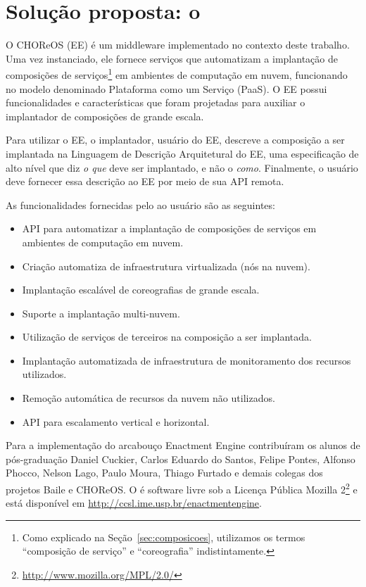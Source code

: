 \chapter{Solução proposta: o \ee}
\label{cap:solucao}

O CHOReOS \ee (EE) é um middleware implementado no contexto deste trabalho.
Uma vez instanciado, ele fornece serviços que automatizam
a implantação de composições de serviços\footnote{Como explicado na Seção~\ref{sec:composicoes}, utilizamos os termos 
``composição de serviço'' e ``coreografia'' indistintamente.} 
em ambientes de computação em nuvem,
funcionando no modelo denominado Plataforma como um Serviço (PaaS).
O EE possui funcionalidades e características que foram projetadas para auxiliar o
implantador de composições de grande escala.

Para utilizar o EE, o implantador, usuário do EE, descreve a composição a ser implantada
na Linguagem de Descrição Arquitetural do EE, uma especificação de alto nível que
diz \emph{o que} deve ser implantado, e não o \emph{como}. 
Finalmente, o usuário deve fornecer essa descrição ao EE por meio de sua API remota.

As funcionalidades fornecidas pelo \ee ao usuário são as seguintes:

\begin{itemize}
\item API para automatizar a implantação de composições de serviços em ambientes de computação em nuvem.
\item Criação automatiza de infraestrutura virtualizada (nós na nuvem).
\item Implantação escalável de coreografias de grande escala.
\item Suporte a implantação multi-nuvem.
\item Utilização de serviços de terceiros na composição a ser implantada.
\item Implantação automatizada de infraestrutura de monitoramento dos recursos utilizados.
\item Remoção automática de recursos da nuvem não utilizados.
\item API para escalamento vertical e horizontal.
\end{itemize}

Para a implementação do arcabouço Enactment Engine contribuíram os alunos de pós-graduação Daniel Cuckier, Carlos Eduardo do Santos, Felipe Pontes, Alfonso Phocco, Nelson Lago, Paulo Moura, Thiago Furtado e demais colegas dos projetos Baile e CHOReOS. O \ee é software livre 
sob a Licença Pública Mozilla 2\footnote{\url{http://www.mozilla.org/MPL/2.0/}} 
e está disponível em \url{http://ccsl.ime.usp.br/enactmentengine}. 

